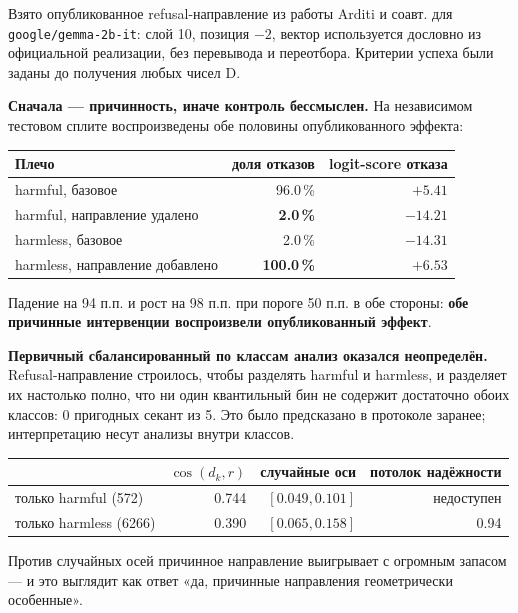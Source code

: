 \documentclass[10pt,a4paper]{article}
\begin{document}
Взято опубликованное refusal-направление из работы Arditi и соавт.
\cite{arditi2024refusal} для \texttt{google/gemma-2b-it}: слой 10, позиция $-2$,
вектор используется дословно из официальной реализации, без перевывода и
переотбора. Критерии успеха были заданы до получения любых чисел D.

\textbf{Сначала — причинность, иначе контроль бессмыслен.} На независимом
тестовом сплите воспроизведены обе половины опубликованного эффекта:

\begin{center}\small
\begin{tabular}{@{}lrr@{}}
\toprule
Плечо & доля отказов & logit-score отказа\\
\midrule
harmful, базовое & 96.0\,\% & $+5.41$\\
harmful, направление удалено & \textbf{2.0\,\%} & $-14.21$\\
harmless, базовое & 2.0\,\% & $-14.31$\\
harmless, направление добавлено & \textbf{100.0\,\%} & $+6.53$\\
\bottomrule
\end{tabular}
\end{center}

\medskip
Падение на 94 п.п. и рост на 98 п.п. при пороге 50 п.п. в обе стороны:
\textbf{обе причинные интервенции воспроизвели опубликованный эффект}.

\textbf{Первичный сбалансированный по классам анализ оказался неопределён.}
Refusal-направление строилось, чтобы разделять harmful и harmless, и разделяет
их настолько полно, что ни один квантильный бин не содержит достаточно обоих
классов: 0 пригодных секант из 5. Это было предсказано в протоколе заранее;
интерпретацию несут анализы внутри классов.

\begin{center}\small
\begin{tabular}{@{}lrrr@{}}
\toprule
& $\cos(d_k, r)$ & случайные оси & потолок надёжности\\
\midrule
только harmful (572) & 0.744 & $[0.049, 0.101]$ & недоступен\\
только harmless (6266) & 0.390 & $[0.065, 0.158]$ & 0.94\\
\bottomrule
\end{tabular}
\end{center}

\medskip
Против случайных осей причинное направление выигрывает с огромным запасом —
и это выглядит как ответ «да, причинные направления геометрически особенные».
\end{document}
